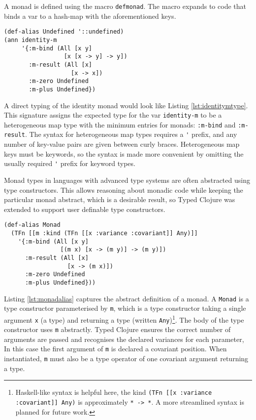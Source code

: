 A monad is defined using the macro \lstinline|defmonad|. The macro expands to code that binds a var to a hash-map
with the aforementioned keys.

\begin{lstlisting}[caption=Type for identity monad, label=lst:identitymtype]
(def-alias Undefined '::undefined)
(ann identity-m
     '{:m-bind (All [x y]
                 [x [x -> y] -> y])
       :m-result (All [x]
                   [x -> x])
       :m-zero Undefined
       :m-plus Undefined})
\end{lstlisting}

A direct typing of the identity monad would look like Listing \ref{lst:identitymtype}.
This signature assigns the expected type for the var \lstinline|identity-m| 
to be a heterogeneous map type with the minimum entries for monads: \lstinline|:m-bind|
and \lstinline|:m-result|. The syntax for heterogeneous map types requires a \lstinline|'| prefix,
and any number of key-value pairs are given between curly braces. Heterogeneous map keys must be keywords,
so the syntax is made more convenient by omitting the usually required \lstinline|'| prefix
for keyword types.

Monad types in languages with advanced type systems are often abstracted using type constructors.
This allows reasoning about monadic code while keeping the particular monad abstract, which is a desirable result,
so Typed Clojure was extended to support user definable type constructors.

\begin{lstlisting}[caption=An abstract definition of a monad., label=lst:monadalias]
(def-alias Monad 
  (TFn [[m :kind (TFn [[x :variance :covariant]] Any)]]
    '{:m-bind (All [x y]
                [(m x) [x -> (m y)] -> (m y)])
      :m-result (All [x]
                  [x -> (m x)])
      :m-zero Undefined
      :m-plus Undefined}))
\end{lstlisting}

Listing \ref{lst:monadalias} captures the abstract definition of a monad.
A \lstinline|Monad| is a type constructor parameterised by \lstinline|m|, which is
a type constructor taking a single argument \lstinline|x| (a type) and returning a type 
(written \lstinline|Any|)\footnote{Haskell-like syntax is helpful here, the kind \lstinline|(TFn [[x :variance :covariant]] Any)|
is approximately \lstinline|* -> *|. A more streamlined syntax is planned for future work.}.
The body of the type constructor uses \lstinline|m| abstractly. Typed Clojure
ensures the correct number of arguments are passed and recognises the declared variances
for each parameter, In this case the first argument of \lstinline|m| is declared
a covariant position. When instantiated, \lstinline|m| must also be a type operator
of one covariant argument returning a type.

